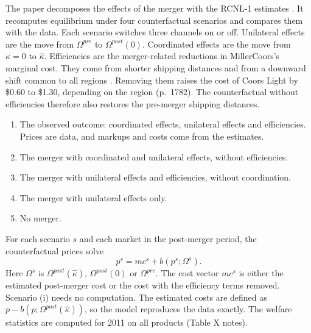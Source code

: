 The paper decomposes the effects of the merger with the RCNL-1 estimates \citep[p.~1786]{MillerWeinberg2017}. It
recomputes equilibrium under four counterfactual scenarios and compares them with the data. Each scenario switches
three channels on or off. Unilateral effects are the move from $\Omega^{pre}$ to $\Omega^{post}(0)$. Coordinated
effects are the move from $\kappa = 0$ to $\hat\kappa$. Efficiencies are the merger-related reductions in
MillerCoors's marginal cost. They come from shorter shipping distances and from a downward shift common to all regions
\citep[p.~1781]{MillerWeinberg2017}. Removing them raises the cost of Coors Light by \$0.60 to \$1.30, depending on the
region (p.~1782). The counterfactual without efficiencies therefore also restores the pre-merger shipping distances.
\begin{enumerate}[label=(\roman*)]
\item The observed outcome: coordinated effects, unilateral effects and efficiencies. Prices are data, and markups
and costs come from the estimates.
\item The merger with coordinated and unilateral effects, without efficiencies.
\item The merger with unilateral effects and efficiencies, without coordination.
\item The merger with unilateral effects only.
\item No merger.
\end{enumerate}
For each scenario $s$ and each market in the post-merger period, the counterfactual prices solve
\begin{equation}\label{eq:11-mc-cf}
  p^{s} = mc^{s} + b(p^{s};\Omega^{s}).
\end{equation}
Here $\Omega^{s}$ is $\Omega^{post}(\hat\kappa)$, $\Omega^{post}(0)$ or $\Omega^{pre}$. The cost vector $mc^{s}$ is
either the estimated post-merger cost or the cost with the efficiency terms removed. Scenario (i) needs no
computation. The estimated costs are defined as $p - b(p;\Omega^{post}(\hat\kappa))$, so the model reproduces the
data exactly. The welfare statistics are computed for 2011 on all products (Table X notes).


